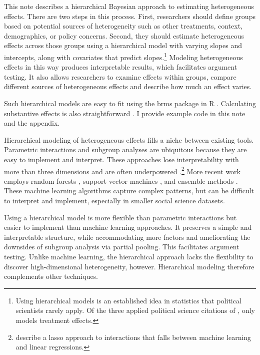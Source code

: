 \documentclass[12pt]{article}
\begin{document}
This note describes a hierarchical Bayesian approach to estimating heterogeneous effects. 
There are two steps in this process. 
First, researchers should define groups based on potential sources of heterogeneity such as other treatments, context, demographics, or policy concerns. 
Second, they should estimate heterogeneous effects across those groups using a hierarchical model with varying slopes and intercepts, along with covariates that predict slopes.\footnote{Using hierarchical models is an established idea in statistics \citep{FellerGelman2015} that political scientists rarely apply. Of the three applied political science citations of \citet{FellerGelman2015}, only \citet{Marquardt2022} models treatment effects.} 
Modeling heterogeneous effects in this way produces interpretable results, which facilitates argument testing.
It also allows researchers to examine effects within groups, compare different sources of heterogeneous effects and describe how much an effect varies.  


Such hierarchical models are easy to fit using the brms package in \textsf{R} \citep{Buerkner2017}. 
Calculating substantive effects is also straightforward \citep{ArelBundockme}.
I provide example code in this note and the appendix.


Hierarchical modeling of heterogeneous effects fills a niche between existing tools.
Parametric interactions and subgroup analyses are ubiquitous because they are easy to implement and interpret.
These approaches lose interpretability with more than three dimensions and are often underpowered \citep{Simmonsetal2011}.\footnote{\citet{BlackwellOlson2022} describe a lasso approach to interactions that falls between machine learning and linear regressions.}
More recent work employs random forests \citep{GreenKern2012, WagerAthey2018}, support vector machines \citep{ImaiRatkovic2013}, and ensemble methods \citep{Grimmeretal2017, Kuenzeletal2019, Dorieetal2022}.
These machine learning algorithms capture complex patterns, but can be difficult to interpret and implement, especially in smaller social science datasets. 

 
Using a hierarchical model is more flexible than parametric interactions but easier to implement than machine learning approaches.  
It preserves a simple and interpretable structure, while accommodating more factors and ameliorating the downsides of subgroup analysis via partial pooling. 
This facilitates argument testing.
Unlike machine learning, the hierarchical approach lacks the flexibility to discover high-dimensional heterogeneity, however.  
Hierarchical modeling therefore complements other techniques. 
\end{document}
